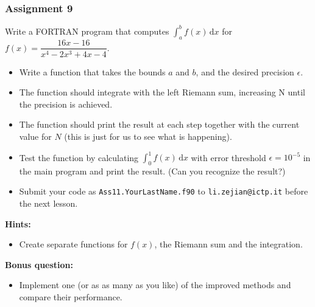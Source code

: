 \documentclass[11pt,aspectratio=169,handout]{beamer}
\begin{document}
\begin{frame}
\frametitle{Assignment 9}
Write a FORTRAN program that computes $\int_a^b f(x)\, \mathrm{d}x$ for  $f(x) = \dfrac{16x-16}{x^4 - 2x^3+4x-4}$.%
\begin{itemize}
\item Write a function that takes the bounds $a$ and $b$, and the desired precision $\epsilon$.
\pause
\item The function should integrate with the left Riemann sum, increasing N until the precision is achieved.
\pause
\item The function should print the result at each step together with the current value for $N$ (this is just for us to see what is happening).
\pause
\item Test the function by calculating $\int_0^1 f(x)\, \mathrm{d}x$ with error threshold $\epsilon=10^{-5}$ in the main program and print the result. (Can you recognize the result?)
\pause
\item Submit your code as \texttt{Ass11.YourLastName.f90} to \texttt{li.zejian@ictp.it} before the next lesson.
\end{itemize}
\textbf{Hints:}
\begin{itemize}
\item Create separate functions for $f(x)$, the Riemann sum and the integration.
\end{itemize}
\pause
\textbf{Bonus question:}
\begin{itemize}
	\item Implement one (or as as many as you like) of the improved methods and compare their performance.
\end{itemize}

\end{frame}
\end{document}

